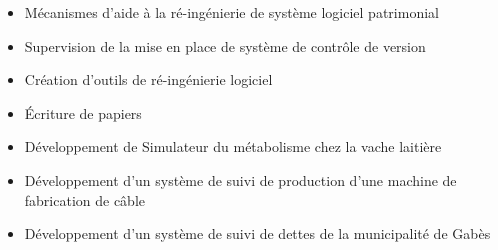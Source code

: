\documentclass[10pt,a4paper,ragged2e,withhyper]{altacv}
\begin{document}
\begin{paracol}{2}


\begin{itemize}
\item Mécanismes d'aide à la ré-ingénierie de système logiciel patrimonial
\item Supervision de la mise en place de système de contrôle de version
\end{itemize}

\divider

\begin{itemize}
\item Création d'outils de ré-ingénierie logiciel
\item Écriture de papiers
\end{itemize}

\divider

\begin{itemize}
\item Développement de Simulateur du métabolisme chez la vache laitière
\end{itemize}

\divider

\begin{itemize}
\item Développement d'un système de suivi de production d'une machine de fabrication de câble
\end{itemize}

\divider

\begin{itemize}
\item Développement d'un système de suivi de dettes de la municipalité de Gabès
\end{itemize}






\end{paracol}
\end{document}
